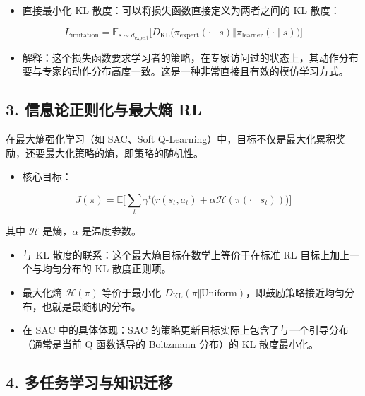 \begin{itemize}
\tightlist
\item
  直接最小化 KL 散度：可以将损失函数直接定义为两者之间的 KL 散度：
\end{itemize}

\[
L_{\mathrm{imitation}}
=
\mathbb{E}_{s\sim d_{\mathrm{expert}}}
\bigl[
D_{\mathrm{KL}}\bigl(
\pi_{\mathrm{expert}}(\cdot\mid s)
\Vert
\pi_{\mathrm{learner}}(\cdot\mid s)
\bigr)
\bigr]
\]

\begin{itemize}
\tightlist
\item
  解释：这个损失函数要求学习者的策略，在专家访问过的状态上，其动作分布要与专家的动作分布高度一致。这是一种非常直接且有效的模仿学习方式。
\end{itemize}

\hypertarget{ux4fe1ux606fux8bbaux6b63ux5219ux5316ux4e0eux6700ux5927ux71b5-rl}{%
\subsection{3. 信息论正则化与最大熵 RL}\label{ux4fe1ux606fux8bbaux6b63ux5219ux5316ux4e0eux6700ux5927ux71b5-rl}}

在最大熵强化学习（如 SAC、Soft Q-Learning）中，目标不仅是最大化累积奖励，还要最大化策略的熵，即策略的随机性。

\begin{itemize}
\tightlist
\item
  核心目标：
\end{itemize}

\[
J(\pi)
=
\mathbb{E}
\bigl[
\sum_t \gamma^{t}
\bigl(
r(s_t,a_t)+\alpha\mathcal{H}(\pi(\cdot\mid s_t))
\bigr)
\bigr]
\]

其中 \(\mathcal{H}\) 是熵，\(\alpha\) 是温度参数。

\begin{itemize}
\tightlist
\item
  与 KL 散度的联系：这个最大熵目标在数学上等价于在标准 RL 目标上加上一个与均匀分布的 KL 散度正则项。
\item
  最大化熵 \(\mathcal{H}(\pi)\) 等价于最小化 \(D_{\mathrm{KL}}(\pi\Vert\mathrm{Uniform})\)，即鼓励策略接近均匀分布，也就是最随机的分布。
\item
  在 SAC 中的具体体现：SAC 的策略更新目标实际上包含了与一个引导分布（通常是当前 Q 函数诱导的 Boltzmann 分布）的 KL 散度最小化。
\end{itemize}

\hypertarget{ux591aux4efbux52a1ux5b66ux4e60ux4e0eux77e5ux8bc6ux8fc1ux79fb}{%
\subsection{4. 多任务学习与知识迁移}\label{ux591aux4efbux52a1ux5b66ux4e60ux4e0eux77e5ux8bc6ux8fc1ux79fb}}

